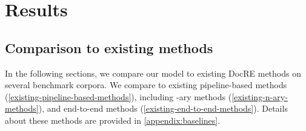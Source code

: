 \documentclass[11pt]{article}
\begin{document}
\section{Results}

\subsection{Comparison to existing methods} \label{comparison-to-existing-methods}

In the following sections, we compare our model to existing DocRE methods on several benchmark corpora. We compare to existing pipeline-based methods (\textsection \ref{existing-pipeline-based-methods}), including -ary methods (\textsection \ref{existing-n-ary-methods}), and end-to-end methods (\textsection \ref{existing-end-to-end-methods}). Details about these methods are provided in \autoref{appendix:baselines}.

\begin{table}[t]
\centering
\caption{Comparison to existing pipeline-based methods. Performance reported as micro-precision, recall and F1-scores (\%) on the CDR and GDA test sets. Results below the horizontal line are not comparable to existing methods. Bold: best scores.}
\label{tab:02}
\vspace{-1mm}
\end{table}
\end{document}
